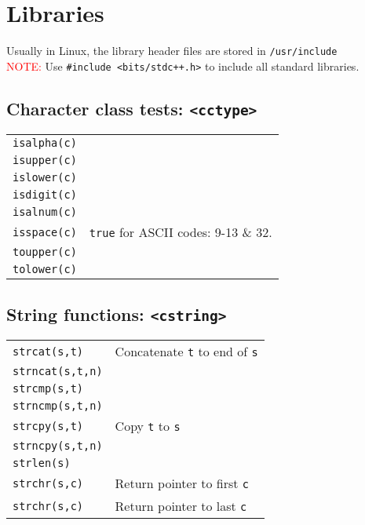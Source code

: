 \section{Libraries}
Usually in Linux, the library header files are stored in \texttt{/usr/include}\\
\textcolor{red}{NOTE:} Use \verb!#include <bits/stdc++.h>! to include all standard libraries.\\

\subsection{Character class tests: \texttt{<cctype>}}
\begin{tabularx}{\linewidth}{lX}
\texttt{isalpha(c)} &\\
\texttt{isupper(c)} &\\
\texttt{islower(c)} &\\
\texttt{isdigit(c)} &\\
\texttt{isalnum(c)} & \\
\texttt{isspace(c)} & \texttt{true} for ASCII codes: 9-13 \& 32.\\
\texttt{toupper(c)} &\\
\texttt{tolower(c)} &\\
\end{tabularx}

\subsection{String functions: \texttt{<cstring>}}
\begin{tabularx}{\linewidth}{lX}
\texttt{strcat(s,t)} & Concatenate \texttt{t} to end of \texttt{s}\\
\texttt{strncat(s,t,n)}  & \\
\texttt{strcmp(s,t)} & \\
\texttt{strncmp(s,t,n)} & \\
\texttt{strcpy(s,t)} & Copy \texttt{t} to \texttt{s}\\
\texttt{strncpy(s,t,n)} & \\
\texttt{strlen(s)} & \\
\texttt{strchr(s,c)} & Return pointer to first \texttt{c}\\
\texttt{strchr(s,c)} & Return pointer to last \texttt{c}\\
\end{tabularx}


